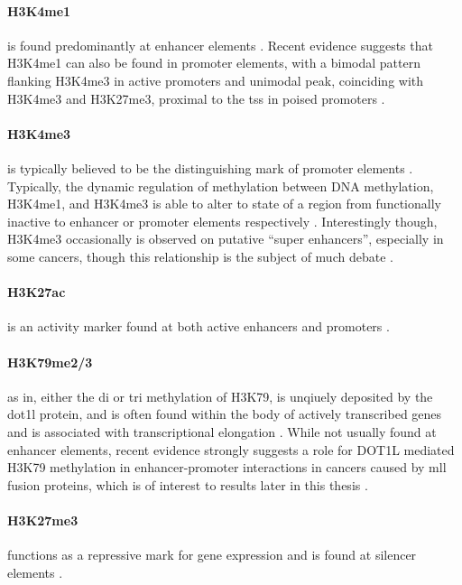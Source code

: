 \paragraph{H3K4me1} is found predominantly at enhancer elements \cite{Gates2017}. Recent evidence suggests that H3K4me1 can also be found in promoter elements, with a bimodal pattern flanking H3K4me3 in active promoters and unimodal peak, coinciding with H3K4me3 and H3K27me3, proximal to the \gls{tss} in poised promoters \cite{Bae2020}.  

\paragraph{H3K4me3} is typically believed to be the distinguishing mark of promoter elements \cite{Gates2017}. Typically, the dynamic regulation of methylation between DNA methylation, H3K4me1, and H3K4me3 is able to alter to state of a region from functionally inactive to enhancer or promoter elements respectively \cite{Sharifi-Zarchi2017}. Interestingly though, H3K4me3 occasionally is observed on putative ``super enhancers'', especially in some cancers, though this relationship is the subject of much debate \cite{Li2019}.  

\paragraph{H3K27ac} is an activity marker found at both active enhancers and promoters \cite{Gates2017}.

\paragraph{H3K79me2/3} as in, either the di or tri methylation of H3K79, is unqiuely deposited by the \gls{dot1l} protein, and is often found within the body of actively transcribed genes and is associated with transcriptional elongation \cite{DJ2008,Q2002a}. While not usually found at enhancer elements, recent evidence strongly suggests a role for DOT1L mediated H3K79 methylation in enhancer-promoter interactions in cancers caused by \gls{mll} fusion proteins, which is of interest to results later in this thesis \cite{Godfrey2019a}. 

\paragraph{H3K27me3} functions as a repressive mark for gene expression and is found at silencer elements \cite{Cai2021, Gates2017}. 

